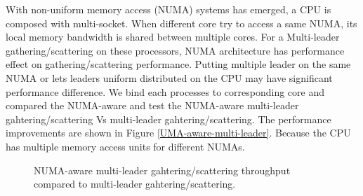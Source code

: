 With non-uniform memory access (NUMA) systems has emerged, a CPU is composed with multi-socket. 
When different core try to access a same NUMA, its local memory bandwidth is shared between multiple cores.
For a Multi-leader gathering/scattering on these processors, NUMA architecture has performance effect on gathering/scattering performance. 
Putting multiple leader on the same NUMA or lets leaders uniform distributed on the CPU may have significant performance difference.
We bind each processes to corresponding core and compared the NUMA-aware and test the NUMA-aware multi-leader gahtering/scattering  Vs multi-leader gahtering/scattering.
The performance improvements are shown in Figure \ref{UMA-aware-multi-leader}.
Because the CPU has multiple memory access units for different NUMAs.
\begin{figure}[!htb]
  \centering
  \caption{NUMA-aware multi-leader gahtering/scattering throughput compared to multi-leader gahtering/scattering.}
	\label{NUMA-aware-multi-leader}
	\vspace{0.2in}
\end{figure}

